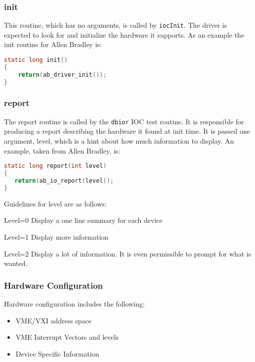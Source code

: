 \subsubsection{init}

This routine, which has no arguments, is called by \verb|iocInit|. The driver is expected to look for and initialize the 
hardware it supports. As an example the init routine for Allen Bradley is:

\begin{lstlisting}[language=C]
static long init()
{
    return(ab_driver_init());
}
\end{lstlisting}

\subsubsection{report}

The report routine is called by the \verb|dbior| IOC test routine. It is responsible for producing a report describing the 
hardware it found at init time. It is passed one argument, level, which is a hint about how much information to display. An 
example, taken from Allen Bradley, is:

\begin{lstlisting}[language=C]
static long report(int level)
{
   return(ab_io_report(level));
}
\end{lstlisting}

Guidelines for level are as follows:

\begin{description}
\item Level=0 Display a one line summary for each device

\item Level=1 Display more information

\item Level=2 Display a lot of information. It is even permissible to prompt for what is wanted.

\end{description}

\subsubsection{Hardware Configuration}

Hardware configuration includes the following:

\begin{itemize}
\item VME/VXI address space

\item VME Interrupt Vectors and levels

\item Device Specific Information

\end{itemize}


